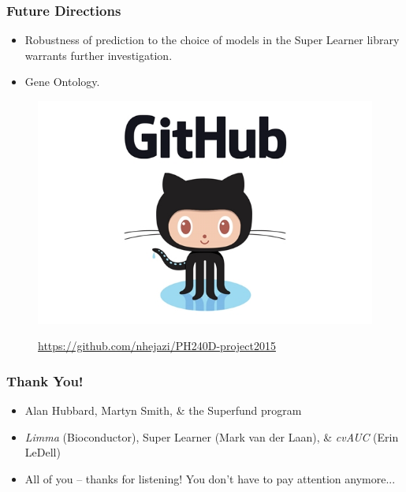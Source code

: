 \documentclass{beamer}
\begin{document}
\begin{frame}[fragile]
  	\frametitle{Future Directions}
		\begin{itemize}
			\item Robustness of prediction to the choice of models in the Super Learner library warrants further investigation. 
			\item Gene Ontology.
		\end{itemize}
  		\begin{figure}
   			\href{https://github.com/nhejazi/PH240D-project2015}
         			{\includegraphics[scale=0.25]{../paper/figs/octocat.png}}
			\caption{\url{https://github.com/nhejazi/PH240D-project2015}}
      		\end{figure}
\end{frame}

\begin{frame}[fragile]
  	\frametitle{Thank You!}
		\begin{itemize}
			\item {Alan Hubbard, Martyn Smith, \& the Superfund program} \\
			\item {\textit{Limma} (Bioconductor), Super Learner (Mark van der Laan), \& \textit{cvAUC} (Erin LeDell)} \\
			\item {All of you -- thanks for listening! You don't have to pay attention anymore...}
		\end{itemize}
\end{frame}
\end{document}
